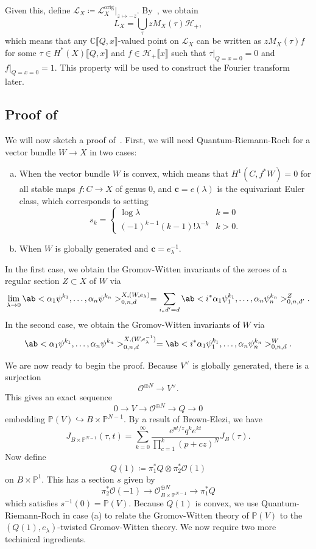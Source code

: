 \documentclass[leqno, openany]{memoir}
\theoremstyle{definition}
\theoremstyle{remark}
\theoremstyle{plain}
\theoremstyle{definition}
\theoremstyle{remark}
\newcommand{\C}{\mathbb{C}}
\renewcommand{\P}{\mathbb{P}}
\newcommand{\mc}[1]{\mathcal{#1}}
\newcommand{\mr}[1]{\mathrm{#1}}
\newcommand{\mbf}[1]{\mathbf{#1}}
\begin{document}
Given this, define $\mc{L}_X \coloneqq \mc{L}_X^{\mr{orig}}|_{z \mapsto -z}$. By~, we obtain
\[ L_X = \bigcup_{\tau} z M_X(\tau) \mc{H}_+, \]
which means that any $\C\llbracket Q,x \rrbracket$-valued point on $\mc{L}_X$ can be written as $z M_X(\tau) f$ for some $\tau \in H^*(X) \llbracket Q,x \rrbracket$ and $f \in \mc{H}_+ \llbracket x \rrbracket$ such that $\tau |_{Q=x=0} = 0$ and $f |_{Q=x=0} = 1$. This property will be used to construct the Fourier transform later.

\subsection{Proof of~}%
\label{sub:Proof of the mirror theorem}

We will now sketch a proof of~. First, we will need Quantum-Riemann-Roch for a vector bundle $W \to X$ in two cases:
\begin{enumerate}[(a)]
    \item When the vector bundle $W$ is convex, which means that $H^1(C, f^*W) = 0$ for all stable maps $f \colon C \to X$ of genus $0$, and $\mbf{c} = e(\lambda)$ is the equivariant Euler class, which corresponds to setting
        \[ s_k = \begin{cases}
            \log \lambda & k=0 \\
            (-1)^{k-1} (k-1)! \lambda^{-k} & k > 0 .
        \end{cases}
        \]
    \item When $W$ is globally generated and $\mbf{c} = e_{\lambda}^{-1}$.
\end{enumerate}

In the first case, we obtain the Gromov-Witten invariants of the zeroes of a regular section $Z \subset X$ of $W$ via
\[ \lim_{\lambda \to 0} \ab< \alpha_1 \psi^{k_1},\ldots,\alpha_n \psi^{k_n}>_{0,n,d}^{X,(W,e_{\lambda})} = \sum_{i_* d' = d} \ab<i^* \alpha_1 \psi_1^{k_1},\ldots,\alpha_n \psi_n^{k_n}>_{0,n,d'}^Z. \]
In the second case, we obtain the Gromov-Witten invariants of $W$ via
\[ \ab< \alpha_1 \psi^{k_1},\ldots,\alpha_n \psi^{k_n}>_{0,n,d}^{X,(W,e_{\lambda}^{-1})} = \ab<i^* \alpha_1 \psi_1^{k_1},\ldots,\alpha_n \psi_n^{k_n}>_{0,n,d}^W. \]

We are now ready to begin the proof. Because $V^{\vee}$ is globally generated, there is a surjection
\[ \mc{O}^{\oplus N} \to V^{\vee}. \]
This gives an exact sequence
\[ 0 \to V \to \mc{O}^{\oplus N} \to Q \to 0 \]
embedding $\P(V) \hookrightarrow B \times \P^{N-1}$. By a result of Brown-Elezi, we have
\[ J_{B \times \P^{N-1}}(\tau, t) = \sum_{k=0}^{\infty} \frac{e^{pt/z} q^k e^{kt}}{\prod_{c=1}^k (p+cz)^N} J_B(\tau). \]
Now define
\[ Q(1) \coloneqq \pi_1^* Q \otimes \pi_2^* \mc{O}(1) \]
on $B \times \P^1$. This has a section $s$ given by
\[ \pi_2^* \mc{O}(-1) \to \mc{O}_{B \times \P^{N-1}}^{\oplus N} \to \pi_1^* Q \]
which satisfies $s^{-1}(0) = \P(V)$. Because $Q(1)$ is convex, we use Quantum-Riemann-Roch in case (a) to relate the Gromov-Witten theory of $\P(V)$ to the $(Q(1), e_{\lambda})$-twisted Gromov-Witten theory. We now require two more techinical ingredients.
\end{document}
